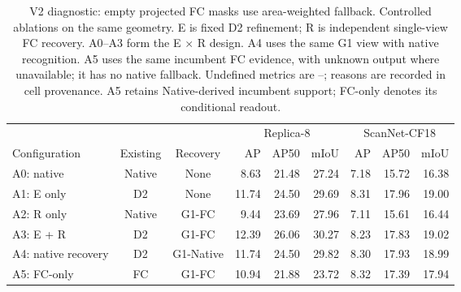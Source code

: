 \begin{table}[!ht]
\centering
\caption{V2 diagnostic: empty projected FC masks use area-weighted fallback. Controlled ablations on the same geometry. E is fixed D2 refinement; R is independent single-view FC recovery. A0--A3 form the E $\times$ R design. A4 uses the same G1 view with native recognition. A5 uses the same incumbent FC evidence, with unknown output where unavailable; it has no native fallback. Undefined metrics are --; reasons are recorded in cell provenance. A5 retains Native-derived incumbent support; FC-only denotes its conditional readout.}
\label{tab:ablation}
\fontsize{9}{10.5}\selectfont
\setlength{\tabcolsep}{4pt}
\begin{tabular*}{\textwidth}{@{\extracolsep{\fill}}lccrrrrrr@{}}
\toprule
& & & \multicolumn{3}{c}{Replica-8} & \multicolumn{3}{c}{ScanNet-CF18} \\
\cmidrule(lr){4-6}\cmidrule(l){7-9}
Configuration & Existing & Recovery & AP & AP50 & mIoU & AP & AP50 & mIoU \\
\midrule
A0: native & Native & None & 8.63 & 21.48 & 27.24 & 7.18 & 15.72 & 16.38 \\
A1: E only & D2 & None & 11.74 & 24.50 & 29.69 & 8.31 & 17.96 & 19.00 \\
A2: R only & Native & G1-FC & 9.44 & 23.69 & 27.96 & 7.11 & 15.61 & 16.44 \\
A3: E + R & D2 & G1-FC & 12.39 & 26.06 & 30.27 & 8.23 & 17.83 & 19.02 \\
\midrule
A4: native recovery & D2 & G1-Native & 11.74 & 24.50 & 29.82 & 8.30 & 17.93 & 18.99 \\
A5: FC-only & FC & G1-FC & 10.94 & 21.88 & 23.72 & 8.32 & 17.39 & 17.94 \\
\bottomrule
\end{tabular*}
\end{table}
